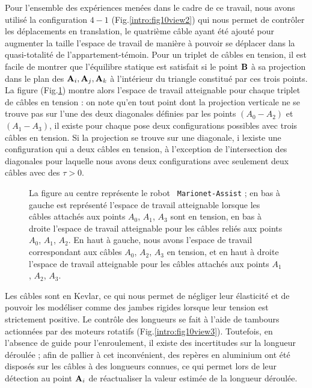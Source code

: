 Pour l'ensemble des expériences menées dans le cadre de ce travail, nous avons 
utilisé la configuration $4-1$ (Fig.\ref{intro:fig10view2}) qui nous permet de 
contrôler les déplacements en translation, le quatrième c\^able ayant été 
ajouté pour augmenter la taille l'espace de travail de manière à pouvoir se 
déplacer dans la quasi-totalité de l'appartement-témoin. Pour un triplet de 
c\^ables en tension, il est facile de montrer que l'\'equilibre statique est 
satisfait si le point ${\bf B}$ \`a sa projection dans le plan des ${\bf 
A}_i,{\bf A}_j,{\bf A}_k$ \`a l'int\'erieur du triangle constitu\'e par ces 
trois points. La figure (Fig.\ref{intro:fig11}) montre alors l'espace de 
travail 
atteignable pour chaque triplet de câbles en tension : on note qu'en tout point 
dont la projection verticale ne se trouve pas sur l'une des deux diagonales 
définies par les points $(A_0-A_2)$ et $(A_1-A_3)$, il existe pour chaque pose 
deux configurations possibles avec trois câbles en tension. Si la projection se 
trouve sur une diagonale, i lexiste une configuration qui a deux c\^ables en 
tension, \`a l'exception de l'intersection des diagonales pour laquelle nous 
avons deux configurations avec seulement deux c\^ables avec des $\tau > 0$.

\begin{figure}[!ht]
\centering
\def\svgwidth{.90\linewidth}

\caption{\footnotesize{La figure au centre représente le robot {\tt 
Marionet-Assist} ; en bas à gauche est représenté l'espace de travail 
atteignable lorsque les câbles attachés aux points $A_0$, $A_1$, $A_3$ sont en 
tension, en bas à droite l'espace de travail atteignable pour les câbles reliés 
aux points $A_0$, $A_1$, $A_2$. En haut à gauche, nous avons l'espace de 
travail 
correspondant aux câbles $A_0$, $A_2$, $A_3$ en tension, et en haut à droite 
l'espace de travail atteignable pour les câbles attachés aux points $A_1$, 
$A_2$, $A_3$.}}
\label{intro:fig11}
\end{figure}

Les câbles sont en Kevlar, ce qui nous permet de négliger leur élasticité et de 
pouvoir les modéliser comme des jambes rigides lorsque leur tension est 
strictement positive. Le contrôle des longueurs se fait à l'aide de tambours 
actionnées par des moteurs rotatifs (Fig.\ref{intro:fig10view3}). Toutefois, en 
l'absence de guide pour l'enroulement, il existe des incertitudes sur la 
longueur déroulée ; afin de pallier à cet inconvénient, des rep\`eres en 
aluminium ont été disposés sur les câbles à des longueurs connues, ce qui 
permet lors de leur détection au point ${\bf A}_i$ de réactualiser la valeur 
estimée de la longueur déroulée.

